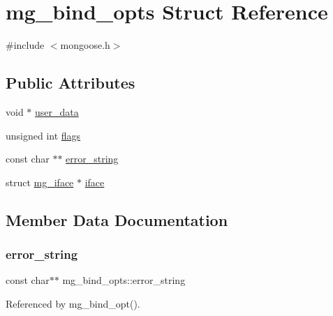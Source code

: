 \hypertarget{structmg__bind__opts}{}\section{mg\+\_\+bind\+\_\+opts Struct Reference}
\label{structmg__bind__opts}


{\ttfamily \#include $<$mongoose.\+h$>$}

\subsection*{Public Attributes}
\begin{DoxyCompactItemize}
\item 
void $\ast$ \hyperlink{structmg__bind__opts_a3bd493ef5bd6c8da605b1480a6c189c4_a3bd493ef5bd6c8da605b1480a6c189c4}{user\+\_\+data}
\item 
unsigned int \hyperlink{structmg__bind__opts_ae257fe726a23692a36fb8c92885d4873_ae257fe726a23692a36fb8c92885d4873}{flags}
\item 
const char $\ast$$\ast$ \hyperlink{structmg__bind__opts_a9320251e7b1a273fedc123a3739fb9fa_a9320251e7b1a273fedc123a3739fb9fa}{error\+\_\+string}
\item 
struct \hyperlink{structmg__iface}{mg\+\_\+iface} $\ast$ \hyperlink{structmg__bind__opts_a328924ea266e19c9add95902d82271ad_a328924ea266e19c9add95902d82271ad}{iface}
\end{DoxyCompactItemize}


\subsection{Member Data Documentation}
\mbox{\label{structmg__bind__opts_a9320251e7b1a273fedc123a3739fb9fa_a9320251e7b1a273fedc123a3739fb9fa}} 
\subsubsection{\texorpdfstring{error\+\_\+string}{error\_string}}
{\footnotesize\ttfamily const char$\ast$$\ast$ mg\+\_\+bind\+\_\+opts\+::error\+\_\+string}



Referenced by mg\+\_\+bind\+\_\+opt().

